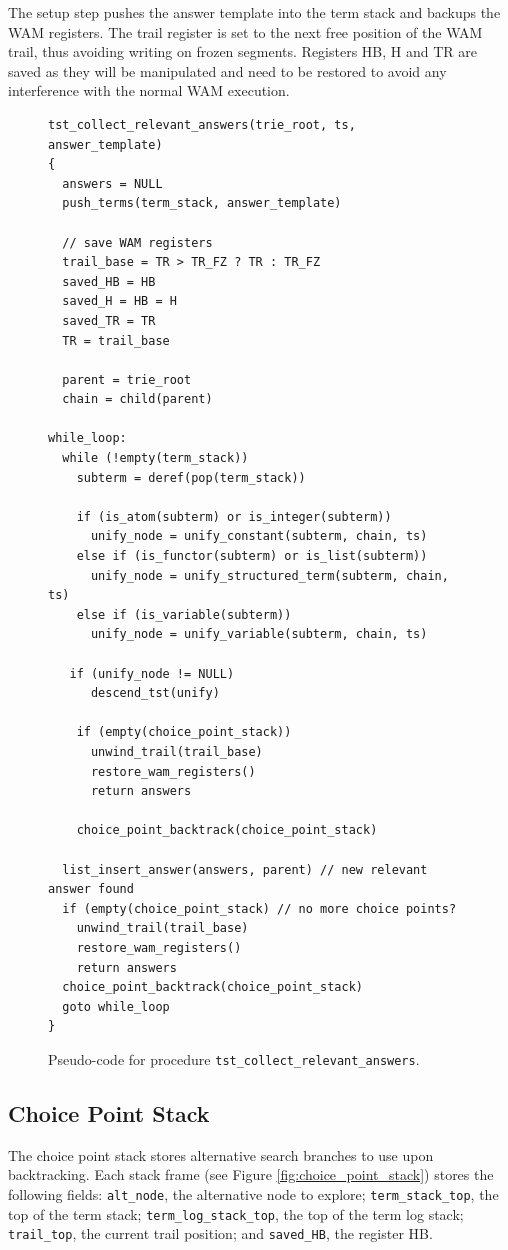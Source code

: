 The setup step pushes the answer template into the term stack and backups the WAM registers.
The trail register is set to the next free position
of the WAM trail, thus avoiding writing on frozen segments. Registers HB, H and TR are
saved as they will be manipulated and need to be restored to avoid any interference with
the normal WAM execution.

\begin{figure}[ht]
\begin{Verbatim}
tst_collect_relevant_answers(trie_root, ts, answer_template)
{
  answers = NULL
  push_terms(term_stack, answer_template)
  
  // save WAM registers
  trail_base = TR > TR_FZ ? TR : TR_FZ
  saved_HB = HB
  saved_H = HB = H
  saved_TR = TR
  TR = trail_base
 
  parent = trie_root
  chain = child(parent)
  
while_loop:
  while (!empty(term_stack))
    subterm = deref(pop(term_stack))
    
    if (is_atom(subterm) or is_integer(subterm))
      unify_node = unify_constant(subterm, chain, ts)
    else if (is_functor(subterm) or is_list(subterm))
      unify_node = unify_structured_term(subterm, chain, ts)
    else if (is_variable(subterm))
      unify_node = unify_variable(subterm, chain, ts)
      
   if (unify_node != NULL)
      descend_tst(unify)
      
    if (empty(choice_point_stack))
      unwind_trail(trail_base)
      restore_wam_registers()
      return answers
    
    choice_point_backtrack(choice_point_stack)
  
  list_insert_answer(answers, parent) // new relevant answer found
  if (empty(choice_point_stack) // no more choice points?
    unwind_trail(trail_base)
    restore_wam_registers()
    return answers  
  choice_point_backtrack(choice_point_stack)
  goto while_loop
}
\end{Verbatim}
\caption{Pseudo-code for procedure \texttt{tst\_collect\_relevant\_answers}.}
\label{fig:tst_collect_relevant_answers}
\end{figure}

\subsection{Choice Point Stack}

The choice point stack stores alternative search branches to use upon backtracking.
Each stack frame (see Figure \ref{fig:choice_point_stack}) stores the following fields:
\texttt{alt\_node}, the alternative node to explore;
\texttt{term\_stack\_top}, the top of the term stack;
\texttt{term\_log\_stack\_top}, the top of the term log stack;
\texttt{trail\_top}, the current trail position;
and \texttt{saved\_HB}, the register HB.

